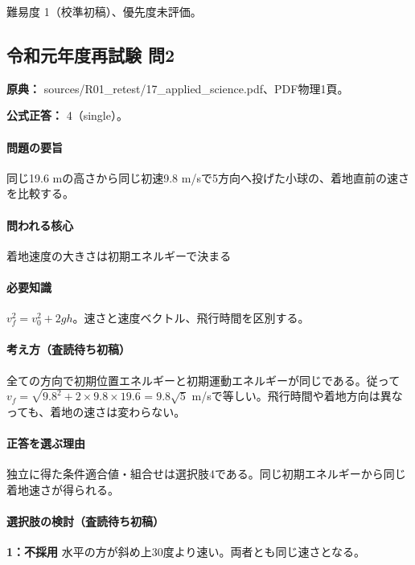 \par 難易度 1（校準初稿）、優先度未評価。

\subsection{令和元年度再試験 問2}
\label{q:r01-ret-applied-02}

\noindent\textbf{原典：} sources/R01\_retest/17\_applied\_science.pdf、PDF物理1頁。

\textbf{公式正答：} 4（single）。

\paragraph{問題の要旨} 同じ19.6 mの高さから同じ初速9.8 m/sで5方向へ投げた小球の、着地直前の速さを比較する。

\paragraph{問われる核心} 着地速度の大きさは初期エネルギーで決まる

\paragraph{必要知識} \(v_f^2=v_0^2+2gh\)。速さと速度ベクトル、飛行時間を区別する。

\paragraph{考え方（査読待ち初稿）} 全ての方向で初期位置エネルギーと初期運動エネルギーが同じである。従って\(v_f=\sqrt{9.8^2+2\times9.8\times19.6}=9.8\sqrt5\) m/sで等しい。飛行時間や着地方向は異なっても、着地の速さは変わらない。

\paragraph{正答を選ぶ理由} 独立に得た条件適合値・組合せは選択肢4である。同じ初期エネルギーから同じ着地速さが得られる。

\paragraph{選択肢の検討（査読待ち初稿）}\mbox{}\par

\noindent\textbf{1：不採用} 水平の方が斜め上30度より速い。両者とも同じ速さとなる。\par

